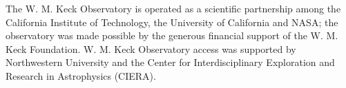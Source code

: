 \documentclass[twocolumn]{aastex631}
\begin{document}
\begin{CJK*}{UTF8}{gbsn}
The W. M. Keck Observatory is operated as a scientific partnership among the California Institute of Technology, the University of California and NASA; the observatory was made possible by the generous financial support of the W. M. Keck Foundation. W. M. Keck Observatory access was supported by Northwestern University and the Center for Interdisciplinary Exploration and Research in Astrophysics (CIERA).









\end{CJK*}
\end{document}
